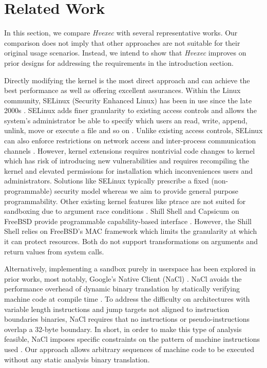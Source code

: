 \documentclass{article}
\newcommand{\PROJNAME}{\textit{Hvexec}}
\begin{document}
\section{Related Work}
In this section, we compare \PROJNAME{} with several representative works.
Our comparison does not imply that other approaches are not suitable for their original usage scenarios.
Instead, we intend to show that \PROJNAME{} improves on prior designs for addressing the requirements in the introduction section.

Directly modifying the kernel is the most direct approach and can achieve the best performance as well as offering excellent assurances.
Within the Linux community, SELinux (Security Enhanced Linux) has been in use since the late 2000s \cite{SELinux2006}.
SELinux adds finer granularity to existing access controls and allows the system's administrator be able to specify which users an read, write, append, unlink, move or execute a file and so on \cite{SELinux2006}.
Unlike existing access controls, SELinux can also enforce restrictions on network access and inter-process communication channels \cite{SELinux2006}. However, kernel extensions requires nontrivial code changes to kernel which has risk of introducing new vulnerabilities \cite{ptrace2002, ptrace2003} and requires recompiling the kernel and elevated permissions for installation which inconveniences users and administrators.
Solutions like SELinux typically prescribe a fixed (non-programmable) security model whereas we aim to provide general purpose programmability.
Other existing kernel features like ptrace are not suited for sandboxing due to argument race conditions \cite{ptrace2003}.
Shill Shell and Capsicum on FreeBSD provide programmable capability-based interface \cite{capsicum2010, shillshell2014}. However, the Shill Shell relies on FreeBSD's MAC framework which limits the granularity at which it can protect resources. Both do not support transformations on arguments and return values from system calls.

Alternatively, implementing a sandbox purely in userspace has been explored in prior works, most notably, Google's Native Client (NaCl) \cite{nacl2009, nacl2011}.
NaCl avoids the performance overhead of dynamic binary translation by statically verifying machine code at compile time \cite{nacl2009}.
To address the difficulty on architectures with variable length instructions and jump targets not aligned to instruction boundaries binaries, NaCl requires that no instructions or pseudo-instructions overlap a 32-byte boundary.
In short, in order to make this type of analysis feasible, NaCl imposes specific constraints on the pattern of machine instructions used \cite{nacl2009}.
Our approach allows arbitrary sequences of machine code to be executed without any static analysis binary translation.
\end{document}
